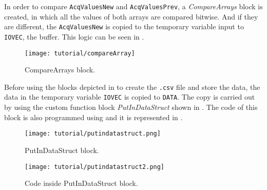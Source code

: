 In order to compare \verb|AcqValuesNew| and \verb|AcqValuesPrev|, a
\emph{CompareArrays} block is created, in which all the values of both arrays are compared
bitwise. And if they are different, the
\verb|AcqValuesNew| is copied to the temporary variable input to \verb|IOVEC|, the buffer.
This logic can be seen in .

\begin{figure}[H] \centering
 \texttt{[image: tutorial/compareArray]}
  \caption{CompareArrays block.}
  \label{fig:compareArrayBlock}
\end{figure}

Before using the blocks depicted in  to create the \verb|.csv| file and store the data, the data in the temporary
variable \verb|IOVEC| is copied to \verb|DATA|. The copy is carried out by using the custom function block
\emph{PutInDataStruct} shown in . The code of this block is also programmed using \SCL{} and it is represented in .  

\begin{figure}[H] \centering
 \texttt{[image: tutorial/putindatastruct.png]}
  \caption{PutInDataStruct block.}
  \label{fig:putInDataStructBlock}
\end{figure}

\begin{figure}[H] \centering
 \texttt{[image: tutorial/putindatastruct2.png]}
  \caption{Code inside PutInDataStruct block.}
  \label{fig:putInDataStructBlockCode}
\end{figure}

